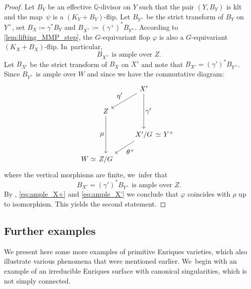 \documentclass[JEP,XML,SOM,Unicode,published]{cedram}
\let\ts\textstyle
\theoremstyle{plain}
\theoremstyle{definition}
\newcommand{\Q}{\mathbb{Q}}
\begin{document}
\begin{proof}
Let $B_Y$ be an effective $\Q$\nobreakdash-divisor on $Y$ such that the pair $(Y,B_Y)$ is klt and the map~$\psi$ is a $(K_Y+B_Y)$-flip. Let $B_{Y^+}$ be the strict transform of $B_Y$ on $Y^+$, set $B_X \coloneqq \gamma^* B_Y$ and $B_{X^+} \coloneqq (\gamma^+)^* B_{Y^+}$.
According to \autoref{lem:lifting_MMP_step}, the $G$\nobreakdash-equivariant flop $\varphi$ is also a $G$\nobreakdash-equivariant $(K_X+B_X)$-flip. In~particular,
\begin{equation}
\label{eq:ample_X+}
B_{X^+} \text{ is ample over } Z.
\end{equation}
Let $B_{X'}$ be the strict transform of $B_X$ on $X'$ and note that $B_{X'} = (\gamma')^* B_{Y^+}$.
Since $B_{Y^+}$ is ample over $W$ and since we have the commutative diagram:
\[
\begin{tikzcd}[row sep = normal, column sep = normal, /tikz/column 1/.append style={column sep = 0pt, inner xsep = 0pt}]
& & X' \arrow[dl, "\ts \eta'"'] \arrow[dd, "\ts \gamma'"] \\
& Z \arrow[dd, "\ts \mu" swap] \\
& & X'/G \arrow[dl, "\ts \theta^+"] & \hspace{-2.8em} \simeq \hspace{1pt} Y^+ \\
W \simeq & Z/G
\end{tikzcd}
\]
where the vertical morphisms are finite, we~infer that
\begin{equation}
\label{eq:ample_X'}
B_{X'} = (\gamma')^* B_{Y^+} \text{ is ample over } Z.
\end{equation}
By \cite[Lem.\,5.3]{Pro21}, \eqref{eq:ample_X+} and \eqref{eq:ample_X'} we conclude that $\varphi$ coincides with $\rho$ up to isomorphism. This yields the second statement.
\end{proof}

\subsection{Further examples}
\label{subsection:examples_Enriques}

We present here some more examples of primitive Enriques varieties, which also illustrate various phenomena that were mentioned earlier. We~begin with an example of an irreducible Enriques surface with canonical singularities, which is not simply connected.
\end{document}
